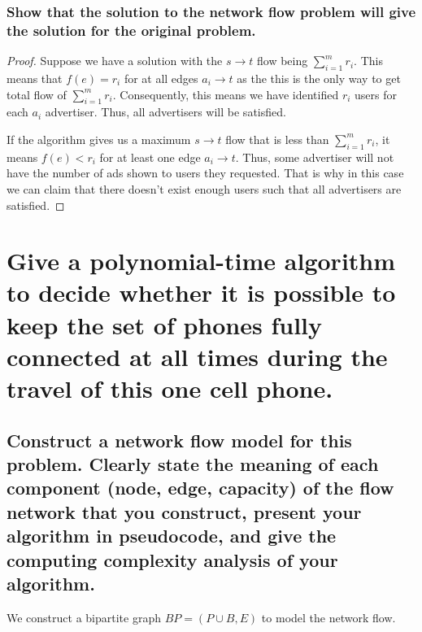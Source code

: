 \documentclass[11pt]{scrartcl}
\begin{document}
\subsubsection{
	Show that the solution to the network flow problem will give the solution for
	the original problem.
}


\begin{proof}
	Suppose we have a solution with the $s \rightarrow t$ flow being $\sum_{i=1}^m r_i$.
	This means that $f(e) = r_i$ for at all edges $a_i \rightarrow t$ as the this is the only
	way to get total flow of $\sum_{i=1}^m r_i$. Consequently, this means we have identified
	$r_i$ users for each $a_i$ advertiser.  Thus, all advertisers will be satisfied.

	If the algorithm gives us a maximum $s \rightarrow t$ flow that is less than $\sum_{i=1}^m r_i$,
	it means $f(e) < r_i$ for at least one edge $a_i \rightarrow t$.
	Thus, some advertiser will not have the number of ads shown to users they requested.
	That is why in this case we can claim that there doesn't exist enough users such that
	all advertisers are satisfied.
\end{proof}




\pagebreak



\section{
  Give a polynomial-time algorithm to decide whether it is possible to
  keep the set of phones fully connected at all times during the travel of
  this one cell phone.
 }

\subsection{
	Construct a network flow model for this problem. Clearly state the
	meaning of each component (node, edge, capacity) of the flow network that you
	construct, present your algorithm in pseudocode, and give the computing complexity
	analysis of your algorithm.
}
We construct a bipartite graph $BP=(P \cup B,E)$ to model the network flow.
\end{document}
